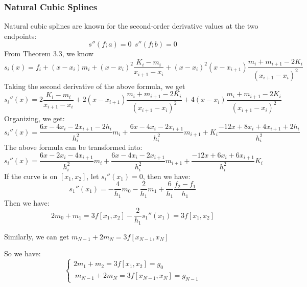 \documentclass[a4paper]{article}
\begin{document}
\subsubsection{Natural Cubic Splines}
Natural cubic splines are known for the second-order derivative values at the two endpoints:
\begin{equation}
    s''(f;a)=0 \ \ s''(f;b)=0 
\end{equation}
From Theorem 3.3, we know
\begin{equation}
    s_i(x) = f_i + (x-x_i)m_i + (x-x_i)^2 \frac{K_i-m_i}{x_{i+1}-x_i} + (x-x_i)^2 (x-x_{i+1})\frac{m_i + m_{i+1}-2K_i}{(x_{i+1}-x_i)^2}
\end{equation}
Taking the second derivative of the above formula, we get
\begin{equation}
    s_i''(x) = 2\frac{K_i-m_i}{x_{i+1}-x_i} + 2(x-x_{i+1})\frac{m_i+m_{i+1}-2K_i}{(x_{i+1}-x_i)^2} + 4(x-x_{i})\frac{m_i+m_{i+1}-2K_i}{(x_{i+1}-x_i)^2} 
\end{equation}
Organizing, we get:
\begin{equation}
    s_i''(x) = \frac{6x-4x_i-2x_{i+1}-2h_i}{h_i^2}m_i + \frac{6x-4x_i-2x_{i+1}}{h_i^2}m_{i+1}+K_i\frac{-12x+8x_i+4x_{i+1}+2h_i}{h_i^2}
\end{equation}
The above formula can be transformed into:
\begin{equation}
    s_i''(x) = \frac{6x-2x_i-4x_{i+1}}{h_i^2}m_i+ \frac{6x-4x_i-2x_{i+1}}{h_i^2}m_{i+1} + \frac{-12x+6x_i+6x_{i+1}}{h_i^2}K_i
\end{equation}
If the curve is on $[x_1,x_2]$, let $s_i''(x_1)=0$, then we have:
\begin{equation}
    s_1''(x_1) = -\frac{4}{h_1}m_0 - \frac{2}{h_1}m_1 + \frac{6}{h_1} \frac{f_2-f_1}{h_1}
\end{equation}
Then we have:
\begin{equation}
    2m_0+m_1 = 3f[x_1,x_2]-\frac{2}{h_1} s_1''(x_1) = 3f[x_1,x_2]
\end{equation}

Similarly, we can get $m_{N-1} + 2m_N = 3f[x_{N-1},x_N]$

So we have:
\begin{equation}
    \left\{ 
    \begin{array}{c}
    2m_1+m_2 = 3f[x_1,x_2] =g_0      \\\
          m_{N-1} + 2m_N = 3f[x_{N-1},x_N]=g_{N-1}
    \end{array}
    \right.
\end{equation}
\end{document}
